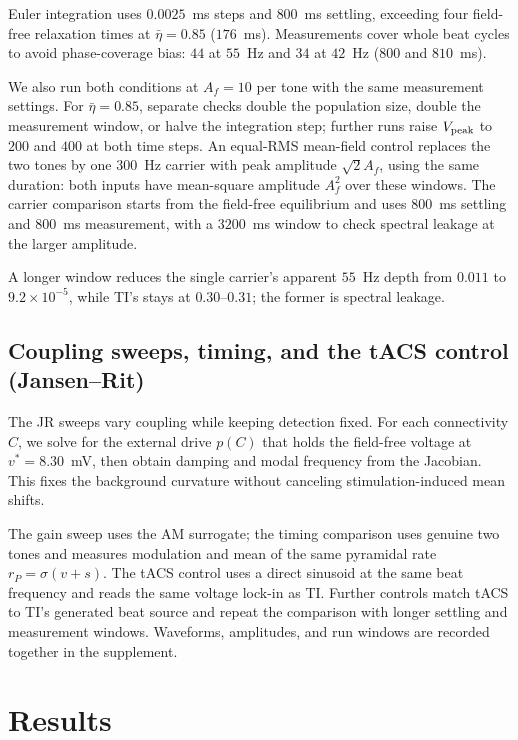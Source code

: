\documentclass[11pt,a4paper]{article}
\newcommand{\Sig}{\sigma}
\providecommand{\DIFaddtex}[1]{{\protect\color{blue} \sf #1}} %
\providecommand{\DIFaddend}{} %
\providecommand{\DIFadd}[1]{\texorpdfstring{\DIFaddtex{#1}}{#1}} %
\begin{document}
\DIFadd{Euler integration uses $0.0025$~ms steps and $800$~ms settling, exceeding
four field-free relaxation times at $\bar\eta=0.85$ ($176$~ms).
Measurements cover whole beat cycles to avoid phase-coverage bias:
$44$ at $55$~Hz and $34$ at $42$~Hz ($800$ and $810$~ms).
}

\DIFadd{We also run both conditions at $A_f=10$ per tone with the same measurement
settings. For $\bar\eta=0.85$, separate checks double the population size,
double the measurement window, or halve the integration step; further runs raise
$V_{\rm peak}$ to $200$ and $400$ at both time steps. An equal-RMS
mean-field control replaces the two tones by one $300$~Hz carrier with peak
amplitude $\sqrt{2}A_f$, using the same duration: both inputs have mean-square
amplitude $A_f^2$ over these windows. The carrier comparison starts from the
field-free equilibrium and uses $800$~ms settling and $800$~ms measurement,
with a $3200$~ms window to check spectral leakage at the larger amplitude.
}

\DIFadd{A longer window reduces the single carrier's apparent $55$~Hz
depth from $0.011$ to $9.2\times10^{-5}$, while TI's stays at $0.30$--$0.31$;
the former is spectral leakage.
}

\fi

\DIFaddend \subsection{Coupling sweeps, timing, and the tACS control (Jansen--Rit)}
The JR sweeps vary coupling while keeping detection fixed. For each
connectivity $C$, we solve for the external drive $p(C)$ that holds the
field-free voltage at $v^*=8.30$~mV, then obtain damping and modal frequency
from the Jacobian. This fixes the background curvature without canceling
stimulation-induced mean shifts.

The gain sweep uses the AM surrogate; the timing comparison uses genuine
two tones and measures modulation and mean of the same pyramidal rate
$r_P=\Sig(v+s)$. The tACS control uses a direct sinusoid at the same beat
frequency and reads the same voltage lock-in as TI. Further controls match
tACS to TI's generated beat source and repeat the comparison with longer
settling and measurement windows. Waveforms, amplitudes, and run windows
are recorded together in the supplement.

\section{Results}
\end{document}
